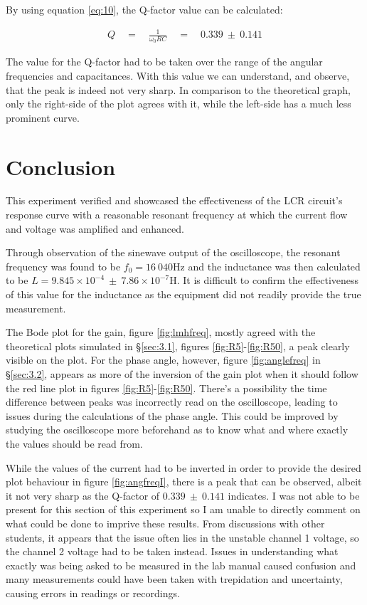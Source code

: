 \documentclass[12pt]{article}
\begin{document}
By using equation \ref{eq:10}, the Q-factor value can be calculated:

\begin{gather}
    Q \quad = \quad \frac{1}{\omega_0 R C} \quad = \quad 0.339 \: \pm \: 0.141
\end{gather}

The value for the Q-factor had to be taken over the range of the angular frequencies and capacitances. With this value we can understand, and observe, that the peak is indeed not
very sharp. In comparison to the theoretical graph, only the right-side of the plot agrees with it, while the left-side has a much less prominent curve.

\section{Conclusion}

This experiment verified and showcased the effectiveness of the LCR circuit's response curve with a reasonable resonant frequency at which the current flow and voltage was amplified and enhanced.

Through observation of the sinewave output of the oscilloscope, the resonant frequency was found to be $f_0 = 16 \: 040$Hz and the inductance was then calculated to be $L = 9.845 \times 10^{-4} \: \pm \: 7.86 \times 10^{-7}$H.
It is difficult to confirm the effectiveness of this value for the inductance as the equipment did not readily provide the true measurement.

The Bode plot for the gain, figure \ref{fig:lmhfreq}, mostly agreed with the theoretical plots simulated in §\ref{sec:3.1}, figures \ref{fig:R5}-\ref{fig:R50}, a peak clearly visible on the plot.
For the phase angle, however, figure \ref{fig:anglefreq} in §\ref{sec:3.2}, appears as more of the inversion of the gain plot when it should follow the red line plot in figures \ref{fig:R5}-\ref{fig:R50}.
There's a possibility the time difference between peaks was incorrectly read on the oscilloscope, leading to issues during the calculations of the phase angle. This could be improved by studying the
oscilloscope more beforehand as to know what and where exactly the values should be read from.

While the values of the current had to be inverted in order to provide the desired plot behaviour in figure \ref{fig:angfreqI}, there is a peak that can be observed, albeit it not very sharp as the
Q-factor of $0.339 \: \pm \: 0.141$ indicates. I was not able to be present for this section of this experiment so I am unable to directly comment on what could be done to imprive these results.
From discussions with other students, it appears that the issue often lies in the unstable channel 1 voltage, so the channel 2 voltage had to be taken instead.
Issues in understanding what exactly was being asked to be measured in the lab manual caused confusion and many measurements could have been taken with trepidation and uncertainty, causing errors in readings
or recordings.
\end{document}
